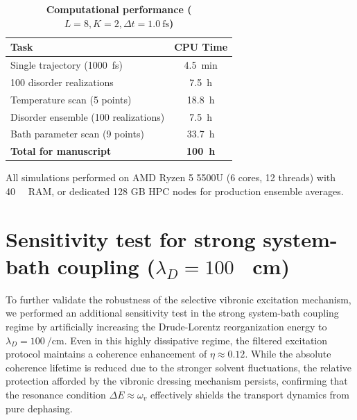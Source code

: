 \documentclass[11pt,a4paper]{article}
\begin{document}
\begin{table}[htb]
\centering
\caption{\textbf{Computational performance ($L=8, K=2, \Delta t=\SI{1.0}{\femto\second}$)}}
\label{tab:SI_performance}
\begin{tabular}{lc}
\toprule
\textbf{Task} & \textbf{CPU Time} \\
\midrule
Single trajectory (\SI{1000}{\femto\second}) & \SI{4.5}{\minute} \\
100 disorder realizations & \SI{7.5}{\hour} \\
Temperature scan (5 points) & \SI{18.8}{\hour} \\
Disorder ensemble (100 realizations) & \SI{7.5}{\hour} \\
Bath parameter scan (9 points) & \SI{33.7}{\hour} \\
\midrule
\textbf{Total for manuscript} & \textbf{\SI{100}{\hour}} \\
\bottomrule
\end{tabular}
\end{table}

All simulations performed on AMD Ryzen 5 5500U (6 cores, 12 threads) with \SI{40}{\giga\byte} RAM, or dedicated 128 GB HPC nodes for production ensemble averages.


\section{Sensitivity test for strong system-bath coupling ($\lambda_D=100$ \si{\per\centi\meter})}
\label{sec:S6}

To further validate the robustness of the selective vibronic excitation mechanism, we performed an additional sensitivity test in the strong system-bath coupling regime by artificially increasing the Drude-Lorentz reorganization energy to $\lambda_D = \SI{100}{\per\centi\meter}$. Even in this highly dissipative regime, the filtered excitation protocol maintains a coherence enhancement of $\eta \approx 0.12$. While the absolute coherence lifetime is reduced due to the stronger solvent fluctuations, the relative protection afforded by the vibronic dressing mechanism persists, confirming that the resonance condition $\Delta E \approx \omega_v$ effectively shields the transport dynamics from pure dephasing.
\end{document}
